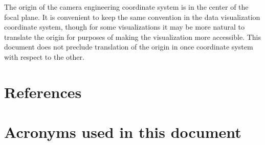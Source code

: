 \documentclass[SE,lsstdraft,toc]{lsstdoc}
\begin{document}
The origin of the camera engineering coordinate system is in the center of the focal plane. It is convenient to keep the same convention in the data visualization coordinate system, though for some visualizations it may be more natural to translate the origin for purposes of making the visualization more accessible. This document does not preclude translation of the origin in once coordinate system with respect to the other.

\appendix
\section{References} \label{sec:bib}


\section{Acronyms used in this document}\label{sec:acronyms}

\end{document}
